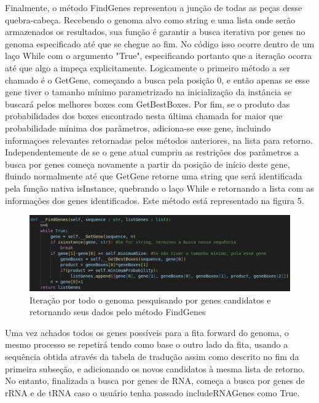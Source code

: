 \documentclass[brazilian,12pt,a4paper,final]{article}
\begin{document}
	
	\vspace{0.5cm}
Finalmente, o método FindGenes representou a junção de todas as peças desse quebra-cabeça. Recebendo o genoma alvo como string e uma lista onde serão armazenados os resultados, sua função é garantir a busca iterativa por genes no genoma especificado até que se chegue ao fim. No código isso ocorre dentro de um laço While com o argumento "True", especificando portanto que a iteração ocorra até que algo a impeça explicitamente. Logicamente o primeiro método a ser chamado é o GetGene, começando a busca pela posição 0, e então apenas se esse gene tiver o tamanho mínimo parametrizado na inicialização da instância se buscará pelos melhores boxes com GetBestBoxes. Por fim, se o produto das probabilidades dos boxes encontrado nesta última chamada for maior que probabilidade mínima dos parâmetros, adiciona-se esse gene, incluindo informaçoes relevantes retornadas pelos métodos anteriores, na lista para retorno. Independentemente de se o gene atual cumpriu as restrições dos parâmetros a busca por genes começa novamente a partir da posição de início deste gene, fluindo normalmente até que GetGene retorne uma string que será identificada pela função nativa isInstance, quebrando o laço While e retornando a lista com as informações dos genes identificados. Este método está representado na figura 5.

\vspace{0.5cm}

\begin{figure}[hbtp]
	\begin{center}
		\includegraphics[]{FindGenes.jpg}
		\caption{Iteração por todo o genoma pesquisando por genes candidatos e retornando seus dados pelo método FindGenes}
		\label{fig}
	\end{center}
\end{figure}

Uma vez achados todos os genes possíveis para a fita forward do genoma, o mesmo processo se repetirá tendo como base o outro lado da fita, usando a sequência obtida através da tabela de tradução assim como descrito no fim da primeira subseção, e adicionando os novos candidatos à mesma lista de retorno.
No entanto, finalizada a busca por genes de RNA, começa a busca por genes de rRNA e de tRNA caso o usuário tenha passado includeRNAGenes como True.
\end{document}

